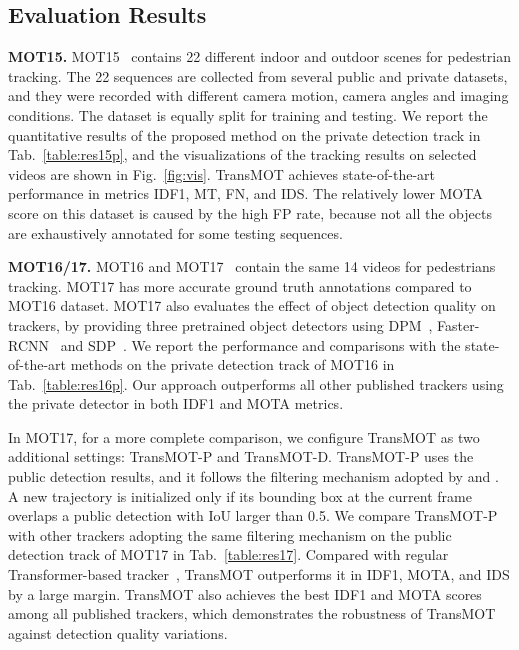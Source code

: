 \documentclass[10pt,twocolumn,letterpaper]{article}
\begin{document}
\vspace{-2mm}



\subsection{Evaluation Results}
\label{sec:res}
\noindent\textbf{MOT15.}
MOT15~\cite{MOTChallenge2015} contains 22 different indoor and outdoor scenes for pedestrian tracking. 
The 22 sequences are collected from several public and private datasets, and they were recorded with different camera motion, camera angles and imaging conditions. 
The dataset is equally split for training and testing. 
We report the quantitative results of the proposed method on the private detection track in Tab.~\ref{table:res15p}, and the visualizations of the tracking results on selected videos are shown in Fig.~\ref{fig:vis}. 
TransMOT achieves state-of-the-art performance in metrics IDF1, MT, FN, and IDS. 
The relatively lower MOTA score on this dataset is caused by the high FP rate, because not all the objects are exhaustively annotated for some testing sequences.

\noindent\textbf{MOT16/17.}
MOT16 and MOT17~\cite{MOT16} contain the same 14 videos for pedestrians tracking.
MOT17 has more accurate ground truth annotations compared to MOT16 dataset. 
MOT17 also evaluates the effect of object detection quality on trackers, by providing three pretrained object detectors using  DPM~\cite{felzenszwalb2010object}, Faster-RCNN~\cite{ren2015faster} and SDP~\cite{yang2016exploit}. 
We report the performance and comparisons with the state-of-the-art methods on the private detection track of MOT16 in Tab.~\ref{table:res16p}. 
Our approach outperforms all other published trackers using the private detector in both IDF1 and MOTA metrics. 

In MOT17, for a more complete comparison, we configure TransMOT as two additional settings: TransMOT-P and TransMOT-D. 
TransMOT-P uses the public detection results, and it follows the filtering mechanism adopted by \cite{bergmann2019tracking} and \cite{zhou2020tracking}.
A new trajectory is initialized only if its bounding box at the current frame overlaps a public detection with IoU larger than 0.5.
We compare TransMOT-P with other trackers adopting the same filtering mechanism on the public detection track of MOT17 in Tab.~\ref{table:res17}. 
Compared with regular Transformer-based tracker~\cite{meinhardt2021trackformer}, TransMOT outperforms it in IDF1, MOTA, and IDS by a large margin. 
TransMOT also achieves the best IDF1 and MOTA scores among all published trackers, which demonstrates the robustness of TransMOT against detection quality variations.    
\end{document}
